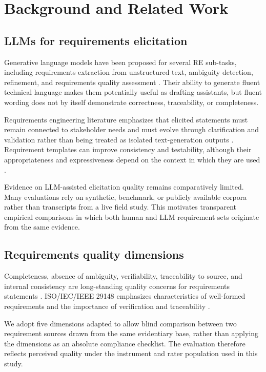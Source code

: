\documentclass[pdflatex,sn-basic]{sn-jnl}
\begin{document}
\section{Background and Related Work}

\subsection{LLMs for requirements elicitation}

Generative language models have been proposed for several RE sub-tasks, including requirements extraction from unstructured text, ambiguity detection, refinement, and requirements quality assessment \citep{cheng2026genai}. Their ability to generate fluent technical language makes them potentially useful as drafting assistants, but fluent wording does not by itself demonstrate correctness, traceability, or completeness.

Requirements engineering literature emphasizes that elicited statements must remain connected to stakeholder needs and must evolve through clarification and validation rather than being treated as isolated text-generation outputs \citep{pohl2010requirements,knauss2018clarification}. Requirement templates can improve consistency and testability, although their appropriateness and expressiveness depend on the context in which they are used \citep{grosser2024templates}.

Evidence on LLM-assisted elicitation quality remains comparatively limited. Many evaluations rely on synthetic, benchmark, or publicly available corpora rather than transcripts from a live field study. This motivates transparent empirical comparisons in which both human and LLM requirement sets originate from the same evidence.

\subsection{Requirements quality dimensions}

Completeness, absence of ambiguity, verifiability, traceability to source, and internal consistency are long-standing quality concerns for requirements statements \citep{iso29148_2018,sommerville2016software,pressman2020software}. ISO/IEC/IEEE 29148 emphasizes characteristics of well-formed requirements and the importance of verification and traceability \citep{iso29148_2018}.

We adopt five dimensions adapted to allow blind comparison between two requirement sources drawn from the same evidentiary base, rather than applying the dimensions as an absolute compliance checklist. The evaluation therefore reflects perceived quality under the instrument and rater population used in this study.
\end{document}
